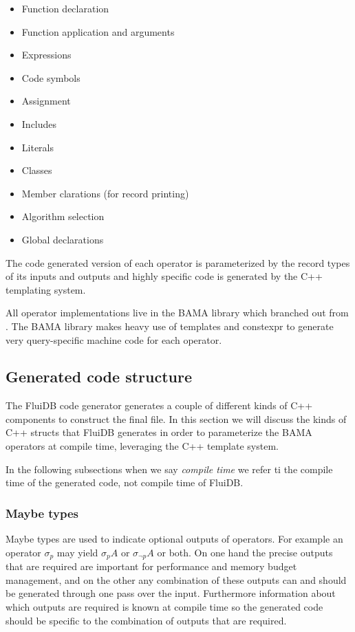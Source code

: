 \begin{itemize}
\item Function declaration
\item Function application and arguments
\item Expressions
\item Code symbols
\item Assignment
\item Includes
\item Literals
\item Classes
\item Member clarations (for record printing)
\item Algorithm selection
\item Global declarations
\end{itemize}

The code generated version of each operator is parameterized by the
record types of its inputs and outputs and highly specific code is
generated by the C++ templating system.

All operator implementations live in the BAMA library which branched
out from \cite{krikellasGeneratingCodeHolistic2010}. The BAMA library
makes heavy use of templates and constexpr to generate very
query-specific machine code for each operator.

\subsection{Generated code structure}

The FluiDB code generator generates a couple of different kinds of C++
components to construct the final file. In this section we will
discuss the kinds of C++ structs that FluiDB generates in order to
parameterize the BAMA operators at compile time, leveraging the C++
template system.

In the following subsections when we say \emph{compile time} we refer ti
the compile time of the generated code, not compile time of FluiDB.

\subsubsection{Maybe types}

Maybe types are used to indicate optional outputs of operators. For
example an operator \(\sigma_p\) may yield \(\sigma_p A\) or
\(\sigma_{\neg p} A\) or both. On one hand the precise outputs that
are required are important for performance and memory budget
management, and on the other any combination of these outputs can and
should be generated through one pass over the input. Furthermore
information about which outputs are required is known at compile time
so the generated code should be specific to the combination of outputs
that are required.

